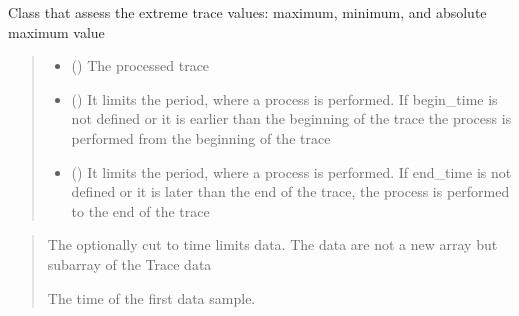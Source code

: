 \documentclass[letterpaper,10pt,english]{sphinxmanual}
\begin{document}
\begin{fulllineitems}
\label{\detokenize{api_core:amw.core.utils.ExtremeTraceValues}}
\pysigstartsignatures
{}
\pysigstopsignatures
\sphinxAtStartPar
Class that assess the extreme trace values: maximum, minimum, and absolute maximum value
\begin{quote}\begin{description}
\begin{itemize}
\item {} 
\sphinxAtStartPar
{} () \textendash{} The processed trace

\item {} 
\sphinxAtStartPar
{} () \textendash{} It limits the period, where a process is performed.
If begin\_time is not defined or it is earlier than the beginning of the trace
the process is performed from the beginning of the trace

\item {} 
\sphinxAtStartPar
{} () \textendash{} It limits the period, where a process is performed.
If end\_time is not defined or it is later than the end of the trace,
the process is performed to the end of the trace

\end{itemize}

\end{description}\end{quote}

\sphinxAtStartPar
{}
\begin{quote}\begin{description}
\sphinxAtStartPar
The optionally cut to time limits data. The data are not a new array but subarray of the Trace data

\sphinxAtStartPar
The time of the first data sample.


\end{description}
\end{quote}
\end{fulllineitems}
\end{document}
